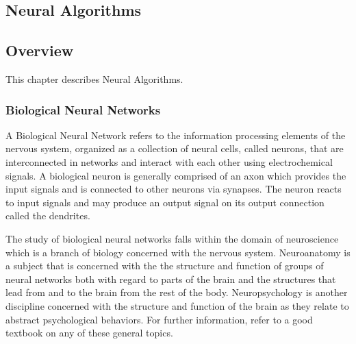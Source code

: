 

\renewcommand{\bibsection}{\subsection{\bibname}}
\begin{bibunit}

\chapter{Neural Algorithms}
\label{ch:neural}

\section{Overview}
This chapter describes Neural Algorithms.

\subsection{Biological Neural Networks}
A Biological Neural Network refers to the information processing elements of the nervous system, organized as a collection of neural cells, called neurons, that are interconnected in networks and interact with each other using electrochemical signals.
A biological neuron is generally comprised of an axon which provides the input signals and is connected to other neurons via synapses. The neuron reacts to input signals and may produce an output signal on its output connection called the dendrites.

The study of biological neural networks falls within the domain of neuroscience which is a branch of biology concerned with the nervous system. 
Neuroanatomy is a subject that is concerned with the the structure and function of groups of neural networks both with regard to parts of the brain and the structures that lead from and to the brain from the rest of the body. 
Neuropsychology is another discipline concerned with the structure and function of the brain as they relate to abstract psychological behaviors.
For further information, refer to a good textbook on any of these general topics.


\end{bibunit}
